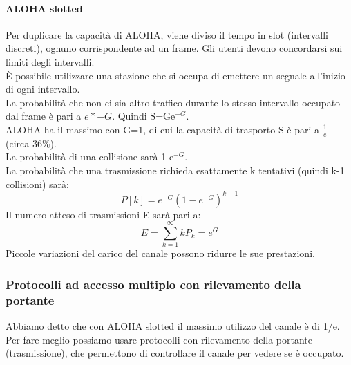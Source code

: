 \documentclass{article}
\begin{document}
\paragraph{ALOHA slotted}
Per duplicare la capacità di ALOHA, viene diviso il tempo in slot (intervalli discreti), ognuno corrispondente ad un frame. Gli utenti devono concordarsi sui limiti degli intervalli.\\
È possibile utilizzare una stazione che si occupa di emettere un segnale all'inizio di ogni intervallo. \\
La probabilità che non ci sia altro traffico durante lo stesso intervallo occupato dal frame è pari a $e*{-G}$. Quindi S=Ge$^{-G}$.
\\ALOHA ha il massimo con G=1, di cui la capacità di trasporto S è pari a $\frac{1}{e}$ (circa 36\%).\\
La probabilità di una collisione sarà 1-e$^{-G}$. \\
La probabilità che una trasmissione richieda esattamente k tentativi (quindi k-1 collisioni) sarà:
\begin{equation}
P[k] = e^{-G}(1-e^{-G})^{k-1}
\end{equation}
Il numero atteso di trasmissioni E sarà pari a:
\begin{equation}
E = \sum_{k=1}^\infty kP_k = e^G
\end{equation}
Piccole variazioni del carico del canale possono ridurre le sue prestazioni.\\
\subsubsection{Protocolli ad accesso multiplo con rilevamento della portante}
Abbiamo detto che con ALOHA slotted il massimo utilizzo del canale è di 1/e.\\
Per fare meglio possiamo usare protocolli con rilevamento della portante (trasmissione), che permettono di controllare il canale per vedere se è occupato.\\
\end{document}
